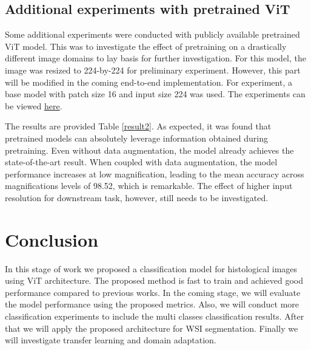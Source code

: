 \documentclass[review]{cvpr}
\begin{document}
\subsection{Additional experiments with pretrained ViT}
Some additional experiments were conducted with publicly available pretrained ViT model. This was to investigate the effect of pretraining on a drastically different image domains to lay basis for further investigation. For this model, the image was resized to 224-by-224 for preliminary experiment. However, this part will be modified in the coming end-to-end implementation. For experiment, a base model with patch size 16 and input size 224 was used. The experiments can be viewed \href{https://wandb.ai/jkgrad/vit-domain-adapt?workspace=user-jkgrad}{here}.

The results are provided Table \ref{result2}. As expected, it was found that pretrained models can absolutely leverage information obtained during pretraining. Even without data augmentation, the model already achieves the state-of-the-art result. When coupled with data augmentation, the model performance increases at low magnification, leading to the mean accuracy across magnifications levels of 98.52, which is remarkable. The effect of higher input resolution for downstream task, however, still needs to be investigated.

\begin{table}[ht]
\centering
{}
\caption{Experiments on pretraining. All models were trained under the same hyperparameters. PT stands for pretraining and AG stands for augmentation.}
\label{result2}
\end{table}


\section{Conclusion}
In this stage of work  we proposed a classification model for histological images using ViT architecture. The proposed method is fast to train and achieved good performance compared to previous works. In the coming stage, we will evaluate the model performance using the proposed metrics. Also, we will conduct more classification experiments to include the multi classes classification results. After that we will apply the proposed architecture for WSI segmentation. Finally we will investigate transfer learning and domain adaptation.

{\small


}
\end{document}
